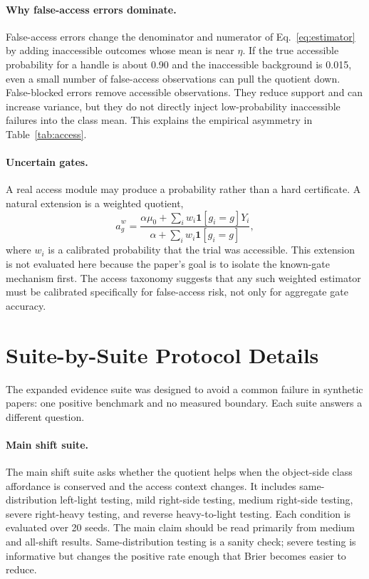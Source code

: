 \documentclass{article}
\newcommand{\aff}{a}
\newcommand{\class}{g}
\newcommand{\ind}{\mathbf{1}}
\begin{document}
\paragraph{Why false-access errors dominate.}
False-access errors change the denominator and numerator of Eq.~\ref{eq:estimator} by adding inaccessible outcomes whose mean is near $\eta$. If the true accessible probability for a handle is about 0.90 and the inaccessible background is 0.015, even a small number of false-access observations can pull the quotient down. False-blocked errors remove accessible observations. They reduce support and can increase variance, but they do not directly inject low-probability inaccessible failures into the class mean. This explains the empirical asymmetry in Table~\ref{tab:access}.

\paragraph{Uncertain gates.}
A real access module may produce a probability rather than a hard certificate. A natural extension is a weighted quotient,
\[
    \hat{\aff}_g^{w} =
    \frac{\alpha\mu_0+\sum_i w_i \ind[\class_i=g]Y_i}
    {\alpha+\sum_i w_i \ind[\class_i=g]},
\]
where $w_i$ is a calibrated probability that the trial was accessible. This extension is not evaluated here because the paper's goal is to isolate the known-gate mechanism first. The access taxonomy suggests that any such weighted estimator must be calibrated specifically for false-access risk, not only for aggregate gate accuracy.

\section{Suite-by-Suite Protocol Details}

The expanded evidence suite was designed to avoid a common failure in synthetic papers: one positive benchmark and no measured boundary. Each suite answers a different question.

\paragraph{Main shift suite.}
The main shift suite asks whether the quotient helps when the object-side class affordance is conserved and the access context changes. It includes same-distribution left-light testing, mild right-side testing, medium right-side testing, severe right-heavy testing, and reverse heavy-to-light testing. Each condition is evaluated over 20 seeds. The main claim should be read primarily from medium and all-shift results. Same-distribution testing is a sanity check; severe testing is informative but changes the positive rate enough that Brier becomes easier to reduce.
\end{document}
